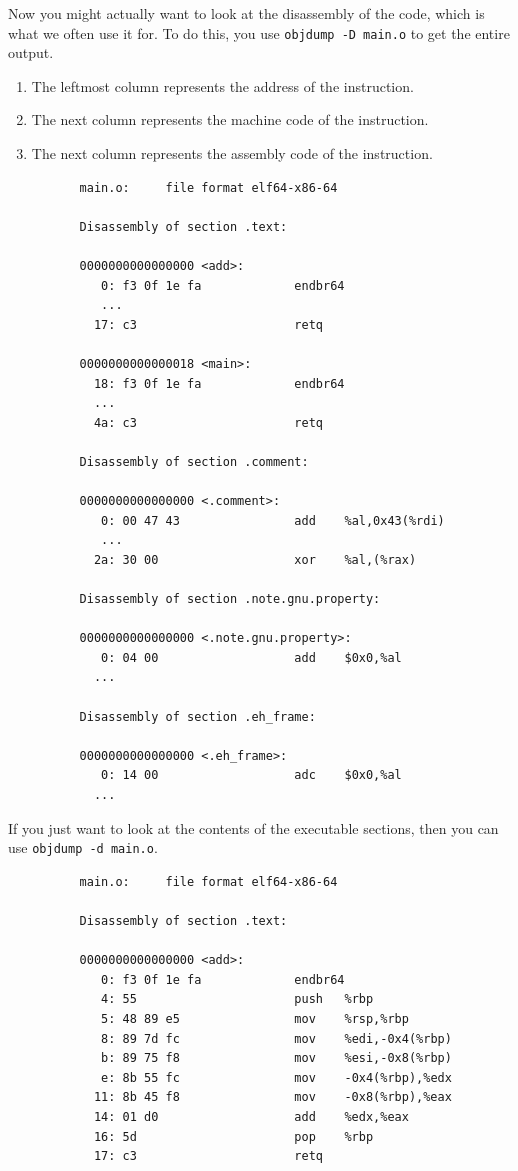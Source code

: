 \documentclass{article}
\begin{document}
      \begin{theorem}
        Now you might actually want to look at the disassembly of the code, which is what we often use it for. To do this, you use \texttt{objdump -D main.o} to get the entire output. 
        \begin{enumerate}
          \item The leftmost column represents the address of the instruction. 
          \item The next column represents the machine code of the instruction. 
          \item The next column represents the assembly code of the instruction. 
        \end{enumerate}
        \begin{lstlisting}
          main.o:     file format elf64-x86-64

          Disassembly of section .text:

          0000000000000000 <add>:
             0:	f3 0f 1e fa          	endbr64 
             ...
            17:	c3                   	retq   

          0000000000000018 <main>:
            18:	f3 0f 1e fa          	endbr64 
            ...
            4a:	c3                   	retq   

          Disassembly of section .comment:

          0000000000000000 <.comment>:
             0:	00 47 43             	add    %al,0x43(%rdi)
             ...
            2a:	30 00                	xor    %al,(%rax)

          Disassembly of section .note.gnu.property:

          0000000000000000 <.note.gnu.property>:
             0:	04 00                	add    $0x0,%al
            ...

          Disassembly of section .eh_frame:

          0000000000000000 <.eh_frame>:
             0:	14 00                	adc    $0x0,%al
            ...
        \end{lstlisting}
        If you just want to look at the contents of the executable sections, then you can use \texttt{objdump -d main.o}.
        \begin{lstlisting}
          main.o:     file format elf64-x86-64

          Disassembly of section .text:

          0000000000000000 <add>:
             0:	f3 0f 1e fa          	endbr64 
             4:	55                   	push   %rbp
             5:	48 89 e5             	mov    %rsp,%rbp
             8:	89 7d fc             	mov    %edi,-0x4(%rbp)
             b:	89 75 f8             	mov    %esi,-0x8(%rbp)
             e:	8b 55 fc             	mov    -0x4(%rbp),%edx
            11:	8b 45 f8             	mov    -0x8(%rbp),%eax
            14:	01 d0                	add    %edx,%eax
            16:	5d                   	pop    %rbp
            17:	c3                   	retq   


\end{lstlisting}
\end{theorem}
\end{document}
